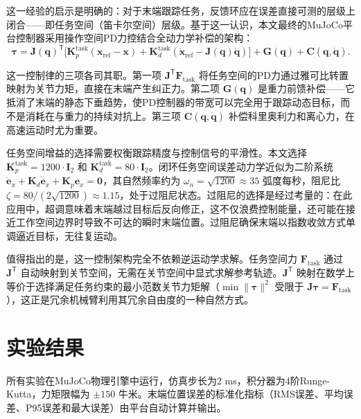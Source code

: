 \documentclass{article}
\begin{document}
这一经验的启示是明确的：对于末端跟踪任务，反馈环应在误差直接可测的层级上闭合——即任务空间（笛卡尔空间）层级。基于这一认识，本文最终的MuJoCo平台控制器采用操作空间PD力控结合全动力学补偿的架构：
\begin{equation}
\boldsymbol{\tau} = \boldsymbol{J}(\boldsymbol{q})^{\mathsf{T}}\bigl[\boldsymbol{K}_p^{\text{task}}(\boldsymbol{x}_{\text{ref}} - \boldsymbol{x}) + \boldsymbol{K}_d^{\text{task}}(\dot{\boldsymbol{x}}_{\text{ref}} - \boldsymbol{J}(\boldsymbol{q})\dot{\boldsymbol{q}})\bigr] + \boldsymbol{G}(\boldsymbol{q}) + \boldsymbol{C}(\boldsymbol{q}, \dot{\boldsymbol{q}}).
\end{equation}

这一控制律的三项各司其职。第一项 \(\boldsymbol{J}^{\mathsf{T}}\boldsymbol{F}_{\text{task}}\) 将任务空间的PD力通过雅可比转置映射为关节力矩，直接在末端产生纠正力。第二项 \(\boldsymbol{G}(\boldsymbol{q})\) 是重力前馈补偿——它抵消了末端的静态下垂趋势，使PD控制器的带宽可以完全用于跟踪动态目标，而不是消耗在与重力的持续对抗上。第三项 \(\boldsymbol{C}(\boldsymbol{q}, \dot{\boldsymbol{q}})\) 补偿科里奥利力和离心力，在高速运动时尤为重要。

任务空间增益的选择需要权衡跟踪精度与控制信号的平滑性。本文选择 \(\boldsymbol{K}_p^{\text{task}} = 1200\cdot\boldsymbol{I}_2\) 和 \(\boldsymbol{K}_d^{\text{task}} = 80\cdot\boldsymbol{I}_2\)。闭环任务空间误差动力学近似为二阶系统 \(\ddot{\boldsymbol{e}}_x + \boldsymbol{K}_d\dot{\boldsymbol{e}}_x + \boldsymbol{K}_p\boldsymbol{e}_x = \boldsymbol{0}\)，其自然频率约为 \(\omega_n = \sqrt{1200}\approx 35\) 弧度每秒，阻尼比 \(\zeta = 80/(2\sqrt{1200})\approx 1.15\)，处于过阻尼状态。过阻尼的选择是经过考量的：在此应用中，超调意味着末端越过目标后反向修正，这不仅浪费控制能量，还可能在接近工作空间边界时导致不可达的瞬时末端位置。过阻尼确保末端以指数收敛方式单调逼近目标，无往复运动。

值得指出的是，这一控制架构完全不依赖逆运动学求解。任务空间力 \(\boldsymbol{F}_{\text{task}}\) 通过 \(\boldsymbol{J}^{\mathsf{T}}\) 自动映射到关节空间，无需在关节空间中显式求解参考轨迹。\(\boldsymbol{J}^{\mathsf{T}}\) 映射在数学上等价于选择满足任务约束的最小范数关节力矩解（\(\min \|\boldsymbol{\tau}\|^2\) 受限于 \(\boldsymbol{J}\boldsymbol{\tau} = \boldsymbol{F}_{\text{task}}\)），这正是冗余机械臂利用其冗余自由度的一种自然方式。

\section{实验结果}

所有实验在MuJoCo物理引擎中运行，仿真步长为2 ms，积分器为4阶Runge-Kutta，力矩限幅为 \(\pm 150\) 牛米。末端位置误差的标准化指标（RMS误差、平均误差、P95误差和最大误差）由平台自动计算并输出。
\end{document}
